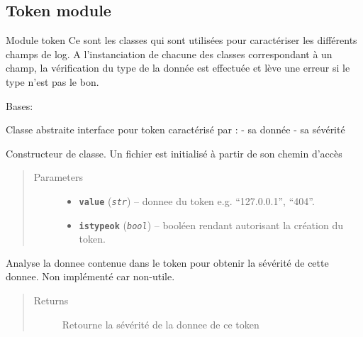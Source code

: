\documentclass[letterpaper,10pt,english]{sphinxmanual}
\begin{document}
\subsection{Token module}
\label{loganalyser:module-loganalyser.token}\label{loganalyser:token-module}
Module token
Ce sont les classes qui sont utilisées pour caractériser les différents champs de log.
A l'instanciation de chacune des classes correspondant à un champ, la vérification du type de la donnée est effectuée et lève une erreur si le type n'est pas le bon.

\begin{fulllineitems}
\label{loganalyser:loganalyser.token.Token}
Bases: 

Classe abstraite interface pour token caractérisé par :
- sa donnée
- sa sévérité

\begin{fulllineitems}
\label{loganalyser:loganalyser.token.Token.__init__}
Constructeur de classe. Un fichier est initialisé à partir de son chemin d'accès
\begin{quote}\begin{description}
\item[{Parameters}] \leavevmode\begin{itemize}
\item {} 
\textbf{\texttt{value}} (\emph{\texttt{str}}) -- donnee du token e.g. ``127.0.0.1'', ``404''.

\item {} 
\textbf{\texttt{istypeok}} (\emph{\texttt{bool}}) -- booléen rendant autorisant la création du token.

\end{itemize}

\end{description}\end{quote}

\end{fulllineitems}


\begin{fulllineitems}
\label{loganalyser:loganalyser.token.Token._Token__analyse}
Analyse la donnee contenue dans le token pour obtenir la sévérité de cette donnee. Non implémenté car non-utile.
\begin{quote}\begin{description}
\item[{Returns}] \leavevmode
Retourne la sévérité de la donnee de ce token


\end{description}
\end{quote}
\end{fulllineitems}
\end{fulllineitems}
\end{document}
